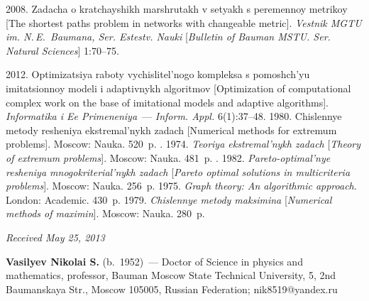 \begin{multicols}{2}
{{\begin{thebibliography}{99}
 2008. Zadacha o kratchayshikh marshrutakh v setyakh s 
peremennoy metrikoy [The shortest paths problem in networks with changeable metric]. 
\textit{Vestnik MGTU im. N.\,E.~Baumana, Ser. Estestv. Nauki} 
[\textit{Bulletin of Bauman MSTU. Ser. Natural Sciences}] 1:70--75.


 2012. Optimizatsiya raboty vychislitel'nogo kompleksa s 
pomoshch'yu imitatsionnoy modeli i adaptivnykh algoritmov 
[Optimization of computational complex work on the base of imitational models and 
adaptive algorithms]. 
\textit{Informatika i Ee Primeneniya}~--- \textit{Inform. Appl.} 6(1):37--48.
 1980. Chislennye metody resheniya ekstremal'nykh zadach 
[Numerical methods for extremum problems]. Moscow: Nauka. 520~p.
. 1974. 
\textit{Teoriya ekstremal'nykh zadach} [\textit{Theory of extremum problems}]. 
Moscow: Nauka. 481~p.
. 1982. 
\textit{Pareto-optimal'nye resheniya mnogokriterial'nykh zadach} 
[\textit{Pareto optimal solutions in multicriteria problems}].  Moscow: Nauka. 256~p.
 1975. \textit{Graph theory: An algorithmic approach}.
 London: Academic. 430~p.
  1979. 
\textit{Chislennye metody maksimina} [\textit{Numerical methods of maximin}]. 
Moscow: Nauka. 280~p.



\end{thebibliography}
} }


\end{multicols}

\vspace*{-6pt}

\hfill{\small\textit{Received May 25, 2013}}

\vspace*{-18pt}

\Contrl

\noindent
\textbf{Vasilyev Nikolai S.} (b.\ 1952)~--- Doctor of Science in physics and mathematics,
professor, Bauman Moscow State Technical University,
5, 2nd Baumanskaya Str., Moscow 105005, Russian Federation; nik8519@yandex.ru



 \label{end\stat}
 
 \renewcommand{\bibname}{\protect\rm Литература}  
 